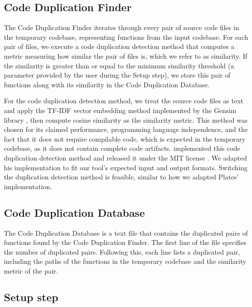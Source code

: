 \subsection{Code Duplication Finder}

The Code Duplication Finder iterates through every pair of source code files in the temporary codebase, representing functions from the input codebase. For each pair of files, we execute a code duplication detection method that computes a metric measuring how similar the pair of files is, which we refer to as similarity. If the similarity is greater than or equal to the minimum similarity threshold (a parameter provided by the user during the Setup step), we store this pair of functions along with its similarity in the Code Duplication Database.

For the code duplication detection method, we treat the source code files as text and apply the TF-IDF vector embedding method implemented by the Gensim library \citep{gensim}, then compute cosine similarity as the similarity metric. This method was chosen for its claimed performance, programming language independence, and the fact that it does not require compilable code, which is expected in the temporary codebase, as it does not contain complete code artifacts. \cite{platistool} implemented this code duplication detection method and released it under the MIT license \citep{mitlicense}. We adapted his implementation to fit our tool's expected input and output formats. Switching the duplication detection method is feasible, similar to how we adapted Plates' implementation.

\subsection{Code Duplication Database}

The Code Duplication Database is a text file that contains the duplicated pairs of functions found by the Code Duplication Finder. The first line of the file specifies the number of duplicated pairs. Following this, each line lists a duplicated pair, including the paths of the functions in the temporary codebase and the similarity metric of the pair.

\subsection{Setup step}
\label{subsec:setup}

